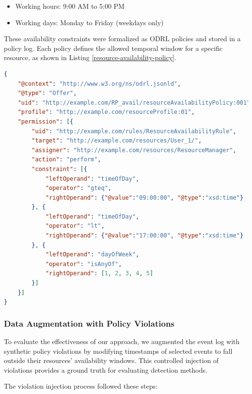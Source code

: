 \begin{itemize}
    \item Working hours: 9:00 AM to 5:00 PM
    \item Working days: Monday to Friday (weekdays only)
\end{itemize}

These availability constraints were formalized as ODRL policies and stored in a policy log. Each policy defines the allowed temporal window for a specific resource, as shown in Listing \ref{resource-availability-policy}.

\begin{lstlisting}[language=json,firstnumber=1,caption={Resource availability policy example},label=resource-availability-policy]
{
    "@context": "http://www.w3.org/ns/odrl.jsonld",
    "@type": "Offer",
    "uid": "http://example.com/RP_avail/resourceAvailabilityPolicy:001",
    "profile": "http://example.com/resourceProfile:01",
    "permission": [{     
        "uid": "http://example.com/rules/ResourceAvailabilityRule",
        "target": "http://example.com/resources/User_1/",  
        "assigner": "http://example.com/resources/ResourceManager",    
        "action": "perform",
        "constraint": [{
            "leftOperand": "timeOfDay",
            "operator": "gteq",
            "rightOperand": {"@value":"09:00:00", "@type":"xsd:time"}
        }, {
            "leftOperand": "timeOfDay",
            "operator": "lt",
            "rightOperand": {"@value":"17:00:00", "@type":"xsd:time"}
        }, {
            "leftOperand": "dayOfWeek",
            "operator": "isAnyOf",
            "rightOperand": [1, 2, 3, 4, 5]
        }]
    }]
}
\end{lstlisting}

\subsubsection{Data Augmentation with Policy Violations}
To evaluate the effectiveness of our approach, we augmented the event log with synthetic policy violations by modifying timestamps of selected events to fall outside their resources' availability windows. This controlled injection of violations provides a ground truth for evaluating detection methods.

The violation injection process followed these steps:

